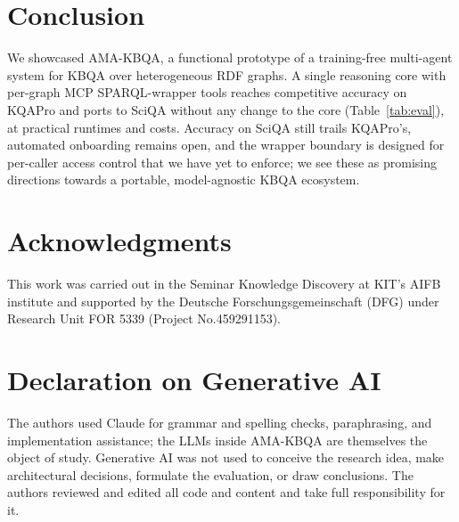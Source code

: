 \documentclass[sigconf,natbib=true]{ceurart}
\begin{document}
\section{Conclusion}
We showcased AMA-KBQA, a functional prototype of a training-free
multi-agent system for KBQA over heterogeneous RDF graphs. A single
reasoning core with per-graph MCP SPARQL-wrapper tools reaches
competitive accuracy on KQAPro and ports to SciQA without any change
to the core (Table~\ref{tab:eval}), at practical runtimes and costs.
Accuracy on SciQA still trails KQAPro's, automated onboarding remains
open, and the wrapper boundary is designed for per-caller access
control that we have yet to enforce; we see these as promising
directions towards a portable, model-agnostic KBQA ecosystem.

\section*{Acknowledgments}
This work was carried out in the Seminar Knowledge Discovery at KIT's AIFB institute and supported by the Deutsche Forschungsgemeinschaft (DFG) under Research Unit FOR 5339 (Project No.459291153).

\section*{Declaration on Generative AI}
The authors used Claude for grammar and spelling checks, paraphrasing, and implementation assistance; the LLMs inside AMA-KBQA are themselves the object of study. Generative AI was not used to conceive the research idea, make architectural decisions, formulate the evaluation, or draw conclusions. The authors reviewed and edited all code and content and take full responsibility for it.


\end{document}
